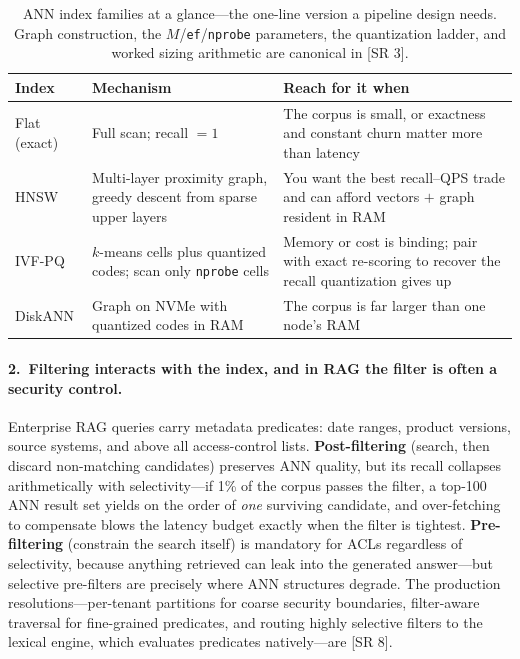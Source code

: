 \begin{table}[H]
\centering
\small
\caption{ANN index families at a glance---the one-line version a pipeline
design needs.  Graph construction, the $M$/\texttt{ef}/\texttt{nprobe}
parameters, the quantization ladder, and worked sizing arithmetic are
canonical in [SR 3].}
\label{fig:hnsw}%
\begin{tabularx}{\textwidth}{@{}l X X@{}}
\toprule
\textbf{Index} & \textbf{Mechanism} & \textbf{Reach for it when} \\
\midrule
Flat (exact) & Full scan; recall $=1$ & The corpus is small, or exactness and constant churn matter more than latency \\
HNSW & Multi-layer proximity graph, greedy descent from sparse upper layers & You want the best recall--QPS trade and can afford vectors $+$ graph resident in RAM \\
IVF-PQ & $k$-means cells plus quantized codes; scan only \texttt{nprobe} cells & Memory or cost is binding; pair with exact re-scoring to recover the recall quantization gives up \\
DiskANN & Graph on NVMe with quantized codes in RAM & The corpus is far larger than one node's RAM \\
\bottomrule
\end{tabularx}
\end{table}

\paragraph{2.\ Filtering interacts with the index, and in RAG the filter is
often a security control.}
Enterprise RAG queries carry metadata predicates: date ranges, product
versions, source systems, and above all access-control lists.
\textbf{Post-filtering} (search, then discard non-matching candidates)
preserves ANN quality, but its recall collapses arithmetically with
selectivity---if 1\% of the corpus passes the filter, a top-100 ANN result set
yields on the order of \emph{one} surviving candidate, and over-fetching to
compensate blows the latency budget exactly when the filter is tightest.
\textbf{Pre-filtering} (constrain the search itself) is mandatory for ACLs
regardless of selectivity, because anything retrieved can leak into the
generated answer---but selective pre-filters are precisely where ANN
structures degrade.  The production resolutions---per-tenant partitions for
coarse security boundaries, filter-aware traversal for fine-grained
predicates, and routing highly selective filters to the lexical engine, which
evaluates predicates natively---are [SR 8].

